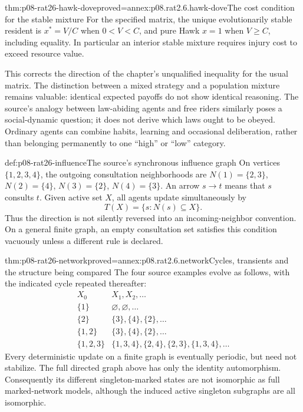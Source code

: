 \begin{hbtheorem}{thm:p08-rat26-hawk-dove}{proved=annex:p08.rat2.6.hawk-dove}{The cost condition for the stable mixture}
For the specified matrix, the unique evolutionarily stable resident
is \(x^*=V/C\) when \(0<V<C\), and pure Hawk \(x=1\) when
\(V\ge C\), including equality. In particular an interior stable
mixture requires injury cost to exceed resource value.
\end{hbtheorem}

This corrects the direction of the chapter's unqualified inequality for
the usual matrix. The distinction between a mixed strategy and a
population mixture remains valuable: identical expected payoffs do not
show identical reasoning. The source's analogy between law-abiding
agents and free riders similarly poses a social-dynamic question; it
does not derive which laws ought to be obeyed. Ordinary agents can
combine habits, learning and occasional deliberation, rather than
belonging permanently to one ``high'' or ``low'' category.

\begin{hbdefinition}{def:p08-rat26-influence}{The source's synchronous influence graph}
On vertices \(\{1,2,3,4\}\), the outgoing consultation neighborhoods
are \(N(1)=\{2,3\}\), \(N(2)=\{4\}\), \(N(3)=\{2\}\),
\(N(4)=\{3\}\). An arrow \(s\to t\) means that \(s\) consults
\(t\). Given active set \(X\), all agents update simultaneously by
\[
 T(X)=\{s:N(s)\subseteq X\}.
\]
Thus the direction is not silently reversed into an incoming-neighbor
convention. On a general finite graph, an empty consultation set satisfies
this condition vacuously unless a different rule is declared.
\end{hbdefinition}

\begin{hbtheorem}{thm:p08-rat26-network}{proved=annex:p08.rat2.6.network}{Cycles, transients and the structure being compared}
The four source examples evolve as follows, with the indicated cycle
repeated thereafter:
\[
\begin{array}{c|l}
X_0&X_1,X_2,\ldots\\\hline
\{1\}&\varnothing,\varnothing,\ldots\\
\{2\}&\{3\},\{4\},\{2\},\ldots\\
\{1,2\}&\{3\},\{4\},\{2\},\ldots\\
\{1,2,3\}&\{1,3,4\},\{2,4\},\{2,3\},\{1,3,4\},\ldots
\end{array}
\]
Every deterministic update on a finite graph is eventually periodic,
but need not stabilize. The full directed graph above has only the
identity automorphism. Consequently its different singleton-marked
states are not isomorphic as full marked-network models, although the
induced active singleton subgraphs are all isomorphic.
\end{hbtheorem}

